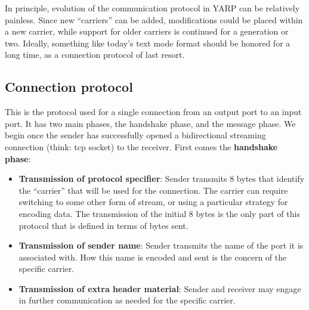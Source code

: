 

In principle, evolution of the communication protocol in YARP can be
relatively painless.  Since new ``carriers'' can be added,
modifications could be placed within a new carrier, while support for
older carriers is continued for a generation or two.  Ideally,
something like today's text mode format should be honored for a long
time, as a connection protocol of last resort.



\subsection{Connection protocol}

This is the protocol used for a single connection from an output port
to an input port. It has two main phases, the handshake phase,
and the message phase.
%
We begin once the sender has successfully opened a bidirectional
streaming connection (think: tcp socket) to the receiver.
First comes the {\bf handshake phase}:

\begin{itemize} \pflist

\item {\bf Transmission of protocol specifier}:
Sender transmits 8 bytes that identify the ``carrier'' that will be
used for the connection.  The carrier can require switching to 
some other form of stream, or using a particular strategy for
encoding data.  The transmission of the initial 8 bytes is the
only part of this protocol that is defined in terms of bytes sent.

\item {\bf Transmission of sender name}: Sender transmits the name of
the port it is associated with.  How this name is encoded and sent is
the concern of the specific carrier.

\item {\bf Transmission of extra header material}: Sender and
receiver may engage in further communication as needed for the
specific carrier.  

\end{itemize}

